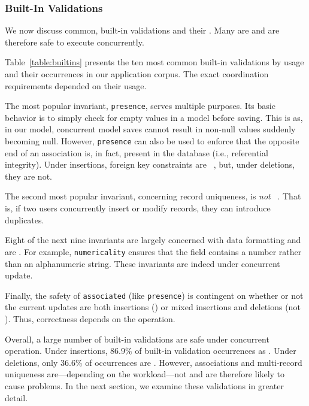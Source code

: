 \subsubsection{Built-In Validations}

We now discuss common, built-in validations and their
\iconfluence. Many are \iconfluent and are therefore safe to execute
concurrently.

Table~\ref{table:builtins} presents the ten most common built-in
validations by usage and their occurrences in our application
corpus. The exact coordination requirements depended on their usage.

The most popular invariant, \texttt{presence}, serves multiple purposes. Its
basic behavior is to simply check for empty values in a model before
saving. This is \iconfluent as, in our model, concurrent model saves
cannot result in non-null values suddenly becoming null. However,
\texttt{presence} can also be used to enforce that the opposite end of
an association is, in fact, present in the database (i.e., referential
integrity). Under insertions, foreign key constraints are
\iconfluent~\cite{coord-avoid}, but, under deletions, they are not.

The second most popular invariant, concerning record uniqueness, is
\textit{not} \iconfluent~\cite{coord-avoid}. That is, if two users
concurrently insert or modify records, they can introduce duplicates.

Eight of the next nine invariants are largely concerned with data
formatting and are \iconfluent. For example, \texttt{numericality}
ensures that the field contains a number rather than an alphanumeric
string. These invariants are indeed \iconfluent under concurrent
update.

Finally, the safety of \texttt{associated} (like \texttt{presence}) is
contingent on whether or not the current updates are both insertions
(\iconfluent) or mixed insertions and deletions (not
\iconfluent). Thus, correctness depends on the operation.

Overall, a large number of built-in validations are safe under
concurrent operation. Under insertions, 86.9\% of built-in validation
occurrences as \iconfluent. Under deletions, only 36.6\% of
occurrences are \iconfluent.  However, associations and multi-record
uniqueness are---depending on the workload---not \iconfluent and are
therefore likely to cause problems. In the next section, we examine
these validations in greater detail.

